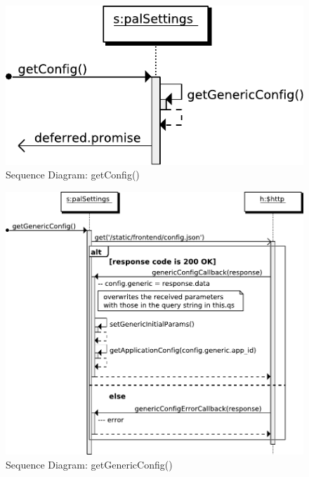 \begin{figure}[htb]
    \centering
    \includegraphics{figures/design/seqdia/palSettings-getConfig.pdf}
    \caption{Sequence Diagram: getConfig()}
    \label{fig:design-seqdia-palSettings-getConfig}
\end{figure}

\begin{figure}[htb]
    \centering
    \includegraphics{figures/design/seqdia/palSettings-getGenericConfig.pdf}
    \caption{Sequence Diagram: getGenericConfig()}
    \label{fig:design-seqdia-palSettings-getGenericConfig}
\end{figure}

